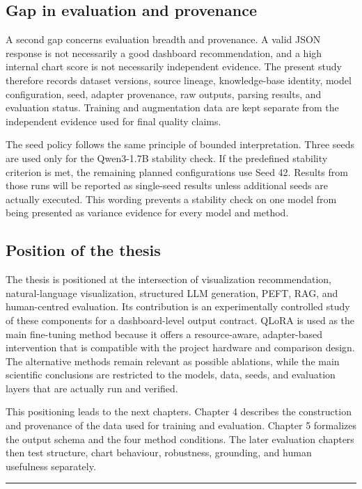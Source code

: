 \subsection{Gap in evaluation and provenance}

A second gap concerns evaluation breadth and provenance. A valid JSON response is not necessarily a good dashboard recommendation, and a high internal chart score is not necessarily independent evidence. The present study therefore records dataset versions, source lineage, knowledge-base identity, model configuration, seed, adapter provenance, raw outputs, parsing results, and evaluation status. Training and augmentation data are kept separate from the independent evidence used for final quality claims.

The seed policy follows the same principle of bounded interpretation. Three seeds are used only for the Qwen3-1.7B stability check. If the predefined stability criterion is met, the remaining planned configurations use Seed 42. Results from those runs will be reported as single-seed results unless additional seeds are actually executed. This wording prevents a stability check on one model from being presented as variance evidence for every model and method.

\subsection{Position of the thesis}

The thesis is positioned at the intersection of visualization recommendation, natural-language visualization, structured LLM generation, PEFT, RAG, and human-centred evaluation. Its contribution is an experimentally controlled study of these components for a dashboard-level output contract. QLoRA is used as the main fine-tuning method because it offers a resource-aware, adapter-based intervention that is compatible with the project hardware and comparison design. The alternative methods remain relevant as possible ablations, while the main scientific conclusions are restricted to the models, data, seeds, and evaluation layers that are actually run and verified.

This positioning leads to the next chapters. Chapter 4 describes the construction and provenance of the data used for training and evaluation. Chapter 5 formalizes the output schema and the four method conditions. The later evaluation chapters then test structure, chart behaviour, robustness, grounding, and human usefulness separately.

\begin{center}\rule{0.5\linewidth}{0.5pt}\end{center}
